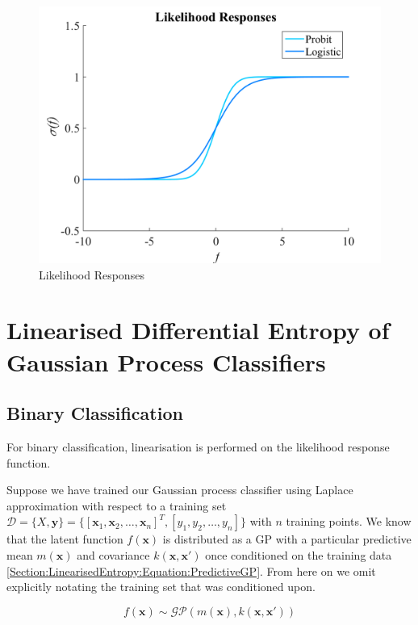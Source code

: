 \documentclass{article}
\renewcommand{\vec}[1]{\boldsymbol{#1}}
\begin{document}
		\begin{figure}[!htbp]
			\centering
				\includegraphics[width = \linewidth]{Figures/responses.png}
			\caption{Likelihood Responses}
			\label{Figure:LikelihoodResponses}
		\end{figure}
	
\section{Linearised Differential Entropy of Gaussian Process Classifiers}
\label{Section:LinearisedEntropy}

	\subsection{Binary Classification}
	
		For binary classification, linearisation is performed on the likelihood response function.
	
		Suppose we have trained our Gaussian process classifier using Laplace approximation with respect to a training set $\mathcal{D} = \{X, \vec{y}\} = \{[ \vec{x}_{1}, \vec{x}_{2}, \dots, \vec{x}_{n}]^{T}, [y_{1}, y_{2}, \dots, y_{n}]\}$ with $n$ training points. We know that the latent function $f(\vec{x})$ is distributed as a GP with a particular predictive mean $m(\vec{x})$ and covariance $k(\vec{x}, \vec{x}')$ once conditioned on the training data \eqref{Section:LinearisedEntropy:Equation:PredictiveGP}. From here on we omit explicitly notating the training set that was conditioned upon.
		
		\begin{equation}
			f(\vec{x}) \sim \mathcal{GP}(m(\vec{x}), k(\vec{x}, \vec{x}'))
		\label{Section:LinearisedEntropy:Equation:PredictiveGP}
		\end{equation}
		
\end{document}
